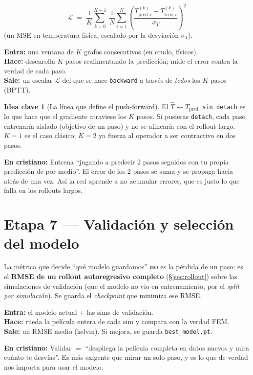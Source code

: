 \documentclass[11pt]{article}
\theoremstyle{definition}
\newtheorem{idea}{Idea clave}[section]
\newcommand{\dummies}[1]{%
  \par\smallskip\noindent
  \colorbox{yellow!18}{\parbox{\dimexpr\linewidth-2\fboxsep}{%
  \small\textbf{En cristiano:} #1}}\par\smallskip}
\newcommand{\io}[3]{%
  \par\smallskip\noindent
  \colorbox{blue!6}{\parbox{\dimexpr\linewidth-2\fboxsep}{\small
  \textbf{Entra:} #1 \\ \textbf{Hace:} #2 \\ \textbf{Sale:} #3}}\par\smallskip}
\begin{document}
\[
  \boxed{\;\mathcal L \;=\; \frac1K\sum_{k=0}^{K-1}\ \frac1N\sum_{i=1}^{N}
    \left(\frac{T^{(k)}_{\text{pred},i}-T^{(k)}_{\text{true},i}}{\sigma_T}\right)^{2}\;}
\]
(un MSE en temperatura física, escalado por la desviación $\sigma_T$).

\io{una ventana de $K$ grafos consecutivos (en crudo, físicos).}
{desenrolla $K$ pasos realimentando la predicción; mide el error contra la verdad de
cada paso.}
{un escalar $\mathcal L$ del que se hace \texttt{backward} a través de \emph{todos}
los $K$ pasos (BPTT).}

\begin{idea}[La línea que define el push-forward]
El \texttt{$\hat T \gets T_{\text{pred}}$ sin \texttt{detach}} es lo que hace que el
gradiente atraviese los $K$ pasos. Si pusieras \texttt{detach}, cada paso entrenaría
aislado (objetivo de un paso) y no se alinearía con el rollout largo. $K{=}1$ es el
caso clásico; $K{=}2$ ya fuerza al operador a ser contractivo en dos pasos.
\end{idea}

\dummies{Entrena ``jugando a predecir 2 pasos seguidos con tu propia predicción de
por medio''. El error de los 2 pasos se suma y se propaga hacia atrás de una vez. Así
la red aprende a no acumular errores, que es justo lo que falla en los rollouts
largos.}

\section{Etapa 7 — Validación y selección del modelo}
\label{sec:val}

La métrica que decide ``qué modelo guardamos'' \textbf{no} es la pérdida de un paso:
es el \textbf{RMSE de un rollout autoregresivo completo} (§\ref{sec:rollout}) sobre
las simulaciones de validación (que el modelo no vio en entrenamiento, por el
\emph{split por simulación}). Se guarda el \emph{checkpoint} que minimiza ese RMSE.

\io{el modelo actual + las sims de validación.}
{rueda la película entera de cada sim y compara con la verdad FEM.}
{un RMSE medio (kelvin). Si mejora, se guarda \texttt{best\_model.pt}.}

\dummies{Validar $=$ ``despliega la película completa en datos nuevos y mira cuánto
te desvías''. Es más exigente que mirar un solo paso, y es lo que de verdad nos
importa para usar el modelo.}
\end{document}
